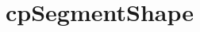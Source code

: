 \hypertarget{group__cp_segment_shape}{}\section{cp\+Segment\+Shape}
\label{group__cp_segment_shape}
